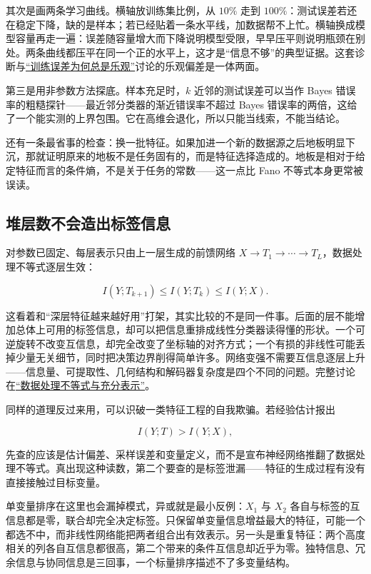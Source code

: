 其次是画两条学习曲线。横轴放训练集比例，从 \(10\%\) 走到 \(100\%\)：测试误差若还在稳定下降，缺的是样本；若已经贴着一条水平线，加数据帮不上忙。横轴换成模型容量再走一遍：误差随容量增大而下降说明模型受限，早早压平则说明瓶颈在别处。两条曲线都压平在同一个正的水平上，这才是``信息不够''的典型证据。这套诊断与\hyperref[sec:13-Machine-Learning/10-Learning-Theory/01]{``训练误差为何总是乐观''}讨论的乐观偏差是一体两面。

第三是用非参数方法探底。样本充足时，\(k\) 近邻的测试误差可以当作 Bayes 错误率的粗糙探针——最近邻分类器的渐近错误率不超过 Bayes 错误率的两倍，这给了一个能实测的上界包围。它在高维会退化，所以只能当线索，不能当结论。

还有一条最省事的检查：换一批特征。如果加进一个新的数据源之后地板明显下沉，那就证明原来的地板不是任务固有的，而是特征选择造成的。地板是相对于给定特征而言的条件熵，不是关于任务的常数——这一点比 Fano 不等式本身更常被误读。

\subsection{堆层数不会造出标签信息}

对参数已固定、每层表示只由上一层生成的前馈网络 \(X\to T_1\to\cdots\to T_L\)，数据处理不等式逐层生效：

\[
I(Y;T_{k+1})\le I(Y;T_k)\le I(Y;X).
\]

这看着和``深层特征越来越好用''打架，其实比较的不是同一件事。后面的层不能增加总体上可用的标签信息，却可以把信息重排成线性分类器读得懂的形状。一个可逆旋转不改变互信息，却完全改变了坐标轴的对齐方式；一个有损的非线性可能丢掉少量无关细节，同时把决策边界削得简单许多。网络变强不需要互信息逐层上升——信息量、可提取性、几何结构和解码器复杂度是四个不同的问题。完整讨论在\hyperref[sec:07-Information-Theory/02-Joint-Information/04]{``数据处理不等式与充分表示''}。

同样的道理反过来用，可以识破一类特征工程的自我欺骗。若经验估计报出

\[
I(Y;T)>I(Y;X),
\]

先查的应该是估计偏差、采样误差和变量定义，而不是宣布神经网络推翻了数据处理不等式。真出现这种读数，第二个要查的是标签泄漏——特征的生成过程有没有直接接触过目标变量。

单变量排序在这里也会漏掉模式，异或就是最小反例：\(X_1\) 与 \(X_2\) 各自与标签的互信息都是零，联合却完全决定标签。只保留单变量信息增益最大的特征，可能一个都选不中，而非线性网络能把两者组合出有效表示。另一头是重复特征：两个高度相关的列各自互信息都很高，第二个带来的条件互信息却近乎为零。独特信息、冗余信息与协同信息是三回事，一个标量排序描述不了多变量结构。

